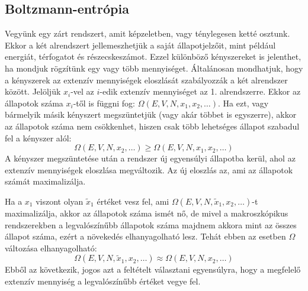 \documentclass[../main.tex]{subfiles}
\begin{document}
\subsection{Boltzmann-entrópia}
Vegyünk egy zárt rendszert, amit képzeletben, vagy ténylegesen ketté osztunk. Ekkor a két alrendszert jellemeszhetjük a saját állapotjelzőit, mint például energiát, térfogatot és részecskeszámot.
Ezzel különböző kényszereket is jelenthet, ha mondjuk rögzítünk egy vagy több mennyiséget. Általánosan mondhatjuk, hogy a kényszerek az extenzív mennyiségek eloszlását szabályozzák a két alrendszer között.
Jelöljük $x_i$-vel az $i$-edik extenzív mennyiséget az 1. alrendszerre. Ekkor az állapotok száma $x_i$-től is függni fog: $\Omega(E, V, N, x_1, x_2, \ldots)$. Ha ezt, vagy bármelyik másik kényszert megszüntetjük (vagy akár többet is egyszerre),
akkor az állapotok száma nem csökkenhet, hiszen csak több lehetséges állapot szabadul fel a kényszer alól:
\begin{equation}
    \Omega(E, V, N, x_2, \ldots) \geq \Omega(E, V, N, x_1, x_2, \ldots)
\end{equation}
A kényszer megszüntetése után a rendszer új egyensúlyi állapotba kerül, ahol az extenzív mennyiségek eloszlása megváltozik. Az új eloszlás az, ami az állapotok számát maximalizálja.

Ha a $x_1$ viszont olyan $\tilde{x}_1$ értéket vesz fel, ami $\Omega(E, V, N, \tilde{x}_1, x_2, \ldots)$-t maximalizálja, akkor az állapotok száma ismét nő, de mivel a makroszkópikus rendszerekben a legvalószínűbb 
állapotok száma majdnem akkora mint az összes állapot száma, ezért a növekedés elhanyagolható lesz. Tehát ebben az esetben $\Omega$ változása elhanyagolható:
\begin{equation}
    \Omega(E, V, N, \tilde{x}_1, x_2, \ldots) \approx \Omega(E, V, N, x_2, \ldots)
\end{equation}
Ebből az következik, jogos azt a feltételt választani egyensúlyra, hogy a megfelelő extenzív mennyiség a legvalószínűbb értéket vegye fel.
\end{document}
